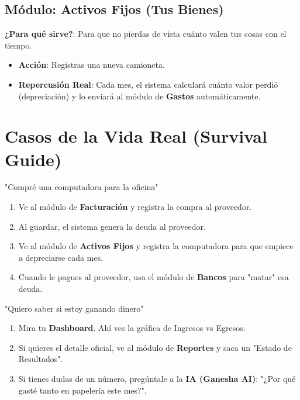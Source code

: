 \documentclass[12pt, landscape, oneside]{book}
\begin{document}
\section{Módulo: Activos Fijos (Tus Bienes)}
\textbf{¿Para qué sirve?}: Para que no pierdas de vista cuánto valen tus cosas con el tiempo.
\begin{itemize}
    \item \textbf{Acción}: Registras una nueva camioneta.
    \item \textbf{Repercusión Real}: Cada mes, el sistema calculará cuánto valor perdió (depreciación) y lo enviará al módulo de \textbf{Gastos} automáticamente.
\end{itemize}

\chapter{Casos de la Vida Real (Survival Guide)}

\begin{escenario}{"Compré una computadora para la oficina"}
    \begin{enumerate}
        \item Ve al módulo de \textbf{Facturación} y registra la compra al proveedor.
        \item Al guardar, el sistema genera la deuda al proveedor.
        \item Ve al módulo de \textbf{Activos Fijos} y registra la computadora para que empiece a depreciarse cada mes.
        \item Cuando le pagues al proveedor, usa el módulo de \textbf{Bancos} para "matar" esa deuda.
    \end{enumerate}
\end{escenario}

\begin{escenario}{"Quiero saber si estoy ganando dinero"}
    \begin{enumerate}
        \item Mira tu \textbf{Dashboard}. Ahí ves la gráfica de Ingresos vs Egresos.
        \item Si quieres el detalle oficial, ve al módulo de \textbf{Reportes} y saca un "Estado de Resultados".
        \item Si tienes dudas de un número, pregúntale a la \textbf{IA (Ganesha AI)}: "¿Por qué gasté tanto en papelería este mes?".
    \end{enumerate}
\end{escenario}
\end{document}
